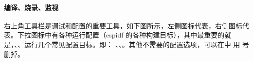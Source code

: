 \documentclass[a4paper,12pt,english]{sphinxmanual}
\begin{document}
\paragraph{编译、烧录、监视}
\label{\detokenize{exp-esp32/ide/esp-idf-clion-dev:id14}}
\sphinxAtStartPar
右上角工具栏是调试和配置的重要工具，如下图所示，左侧图标代表，右侧图标代表。下拉图标中有各种运行配置（esp\sphinxhyphen{}idf 的各种构建目标），其中最重要的就是，、、运行几个常见配置目标。即： 、、。其他不需要的配置选项，可以在中 用 \sphinxcode{\sphinxupquote{\sphinxhyphen{}}} 号 删掉。
\end{document}
